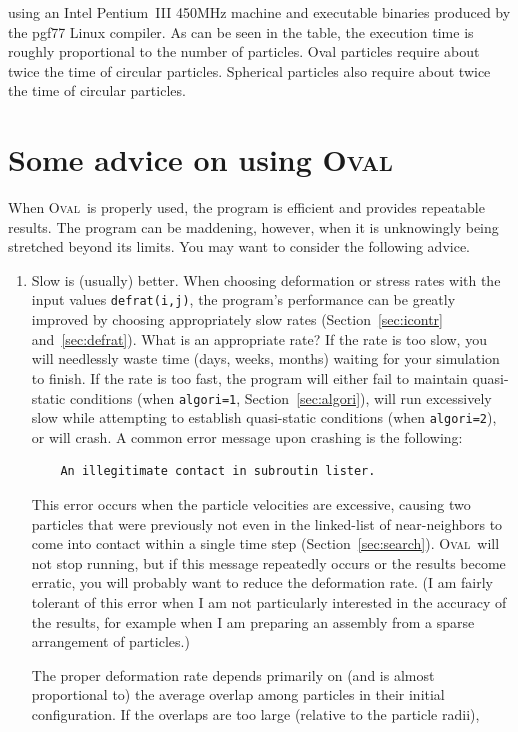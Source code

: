 \documentclass[letterpaper,11pt]{article}
\newcommand{\Oval}{\textsc{Oval}}
\begin{document}
using an Intel Pentium~III 450MHz machine and executable binaries
produced by the pgf77 Linux compiler.
As can be seen in the table, the execution time is roughly proportional to the
number of particles.
Oval particles require about twice the time of circular particles.
Spherical particles also require about twice the time of circular particles.
%
%
\section{Some advice on using \Oval}\label{sec:advice}
When \Oval\ is properly used, the program is efficient and provides
repeatable results.
The program can be maddening, however, when it is unknowingly being stretched
beyond its limits.
You may want to consider the following advice.
\begin{enumerate}
\item\label{item:slowisbetter}
Slow is (usually) better.
When choosing deformation or stress rates with the
input values \texttt{defrat(i,j)}, the program's performance
can be greatly improved by choosing appropriately slow rates
(Section~\ref{sec:icontr} and~\ref{sec:defrat}).
What is an appropriate rate?
If the rate is too slow, you will needlessly waste time (days, weeks,
months) waiting for your simulation to finish.
If the rate is too fast, the program will either fail to maintain
quasi-static conditions (when \texttt{algori=1}, 
Section~\ref{sec:algori}), will run
excessively slow while attempting to establish quasi-static conditions
(when \texttt{algori=2}), or will crash.
A common error message upon crashing is the following:
\begin{verbatim}
    An illegitimate contact in subroutin lister.
\end{verbatim}
This error occurs when the particle velocities are excessive, causing 
two particles that were previously not even in the linked-list
of near-neighbors to come into contact within a single time step
(Section~\ref{sec:search}).
\Oval\ will not stop running, but if this message repeatedly occurs or
the results become erratic, you will probably want to reduce the deformation
rate.
(I am fairly tolerant of this error when I am not particularly interested
in the accuracy of the results, for example when I am preparing an assembly
from a sparse arrangement of particles.)
\par
The proper deformation rate depends primarily on (and is 
almost proportional to)
the average overlap among particles in their initial configuration.
If the overlaps are too large (relative to the particle radii), 

\end{enumerate}
\end{document}
